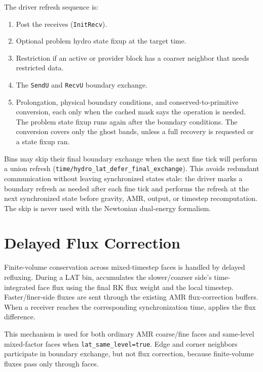 \documentclass[11pt]{article}
\begin{document}
The driver refresh sequence is:
\begin{enumerate}
  \item Post the receives (\texttt{InitRecv}).
  \item Optional problem hydro state fixup at the target time.
  \item Restriction if an active or provider block has a coarser neighbor that
        needs restricted data.
  \item The \texttt{SendU} and \texttt{RecvU} boundary exchange.
  \item Prolongation, physical boundary conditions, and conserved-to-primitive
        conversion, each only when the cached mask says the operation is
        needed.  The problem state fixup runs again after the boundary
        conditions.  The conversion covers only the ghost bands, unless a
        full recovery is requested or a state fixup ran.
\end{enumerate}

Bins may skip their final boundary exchange when the next fine tick will
perform a union refresh (\texttt{time/hydro\_lat\_defer\_final\_exchange}).
This avoids redundant communication without leaving synchronized states stale:
the driver marks a boundary refresh as needed after each fine tick and
performs the refresh at the next synchronized state before gravity, AMR,
output, or timestep recomputation.  The skip is never used with the
Newtonian dual-energy formalism.

\section{Delayed Flux Correction}

Finite-volume conservation across mixed-timestep faces is handled by delayed
refluxing.  During a LAT bin,
 accumulates the slower/coarser side's
time-integrated face flux using the final RK flux weight and the local
timestep.  Faster/finer-side fluxes are sent through the existing AMR
flux-correction buffers.  When a receiver reaches the corresponding
synchronization time,  applies the flux
difference.

This mechanism is used for both ordinary AMR coarse/fine faces and same-level
mixed-factor faces when \texttt{lat\_same\_level=true}.  Edge and corner
neighbors participate in boundary exchange, but not flux correction, because
finite-volume fluxes pass only through faces.
\end{document}
